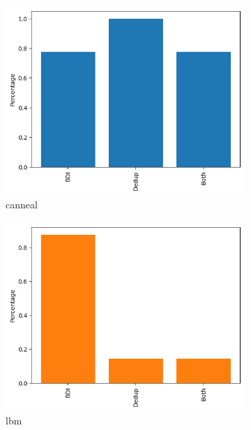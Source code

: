 \begin{figure}
    \begin{subfigure}{\textwidth}
        \includegraphics[width=\textwidth]{canneal.png}
        \caption{canneal}
        \label{fig:canneal}
    \end{subfigure}
    \begin{subfigure}{\textwidth}
        \includegraphics[width=\textwidth]{lbm.png}
        \caption{lbm}
        \label{fig:lbm}
    \end{subfigure}
    \begin{subfigure}{\textwidth}

\end{subfigure}
\end{figure}
